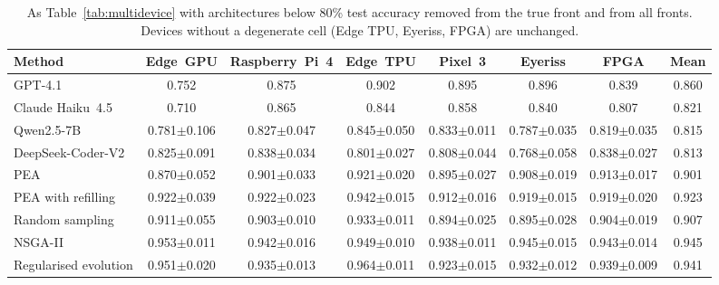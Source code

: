 \documentclass[preprint,12pt,authoryear]{elsarticle}
\begin{document}
\begin{table}[h]\centering\footnotesize
\caption{As Table~\ref{tab:multidevice} with architectures below 80\% test accuracy removed from the true front and from all fronts. Devices without a degenerate cell (Edge TPU, Eyeriss, FPGA) are unchanged.}\label{tab:multidevicefloor}
\setlength{\tabcolsep}{2.5pt}
\begin{adjustbox}{max width=\linewidth}
\begin{tabular}{lccccccc}
\toprule
Method & Edge~GPU & Raspberry~Pi~4 & Edge~TPU & Pixel~3 & Eyeriss & FPGA & Mean \\
\midrule
GPT-4.1 & 0.752 & 0.875 & 0.902 & 0.895 & 0.896 & 0.839 & 0.860 \\
Claude Haiku~4.5 & 0.710 & 0.865 & 0.844 & 0.858 & 0.840 & 0.807 & 0.821 \\
Qwen2.5-7B & 0.781$\pm$0.106 & 0.827$\pm$0.047 & 0.845$\pm$0.050 & 0.833$\pm$0.011 & 0.787$\pm$0.035 & 0.819$\pm$0.035 & 0.815 \\
DeepSeek-Coder-V2 & 0.825$\pm$0.091 & 0.838$\pm$0.034 & 0.801$\pm$0.027 & 0.808$\pm$0.044 & 0.768$\pm$0.058 & 0.838$\pm$0.027 & 0.813 \\
\midrule
PEA & 0.870$\pm$0.052 & 0.901$\pm$0.033 & 0.921$\pm$0.020 & 0.895$\pm$0.027 & 0.908$\pm$0.019 & 0.913$\pm$0.017 & 0.901 \\
PEA with refilling & 0.922$\pm$0.039 & 0.922$\pm$0.023 & 0.942$\pm$0.015 & 0.912$\pm$0.016 & 0.919$\pm$0.015 & 0.919$\pm$0.020 & 0.923 \\
Random sampling & 0.911$\pm$0.055 & 0.903$\pm$0.010 & 0.933$\pm$0.011 & 0.894$\pm$0.025 & 0.895$\pm$0.028 & 0.904$\pm$0.019 & 0.907 \\
NSGA-II & 0.953$\pm$0.011 & 0.942$\pm$0.016 & 0.949$\pm$0.010 & 0.938$\pm$0.011 & 0.945$\pm$0.015 & 0.943$\pm$0.014 & 0.945 \\
Regularised evolution & 0.951$\pm$0.020 & 0.935$\pm$0.013 & 0.964$\pm$0.011 & 0.923$\pm$0.015 & 0.932$\pm$0.012 & 0.939$\pm$0.009 & 0.941 \\
\bottomrule
\end{tabular}
\end{adjustbox}
\end{table}
\end{document}
